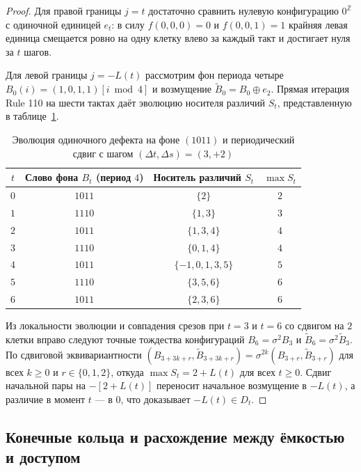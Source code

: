 \begin{proof}
Для правой границы $j = t$ достаточно сравнить нулевую конфигурацию $0^{\mathbb{Z}}$ с одиночной единицей $e_t$: в силу $f(0, 0, 0) = 0$ и $f(0, 0, 1) = 1$ крайняя левая единица смещается ровно на одну клетку влево за каждый такт и достигает нуля за $t$ шагов.

Для левой границы $j = -L(t)$ рассмотрим фон периода четыре $B_0(i) = (1, 0, 1, 1)[i \bmod 4]$ и возмущение $\widetilde B_0 = B_0 \oplus e_2$. Прямая итерация Rule 110 на шести тактах даёт эволюцию носителя различий $S_t$, представленную в таблице~\ref{tab:period4_defect}.

\begin{table}[h]
\centering
\caption{Эволюция одиночного дефекта на фоне $(1011)$ и периодический сдвиг с шагом $(\Delta t, \Delta s) = (3, +2)$}
\label{tab:period4_defect}
\begin{tabular}{cccc}
\toprule
$t$ & Слово фона $B_t$ (период $4$) & Носитель различий $S_t$ & $\max S_t$ \\
\midrule
$0$ & $1011$ & $\{2\}$ & $2$ \\
$1$ & $1110$ & $\{1, 3\}$ & $3$ \\
$2$ & $1011$ & $\{1, 3, 4\}$ & $4$ \\
$3$ & $1110$ & $\{0, 1, 4\}$ & $4$ \\
$4$ & $1011$ & $\{-1, 0, 1, 3, 5\}$ & $5$ \\
$5$ & $1110$ & $\{3, 5, 6\}$ & $6$ \\
$6$ & $1011$ & $\{2, 3, 6\}$ & $6$ \\
\bottomrule
\end{tabular}
\end{table}

Из локальности эволюции и совпадения срезов при $t=3$ и $t=6$ со сдвигом на $2$ клетки вправо следуют точные тождества конфигураций $B_6 = \sigma^2 B_3$ и $\widetilde B_6 = \sigma^2 \widetilde B_3$. По сдвиговой эквивариантности $(B_{3+3k+r}, \widetilde B_{3+3k+r}) = \sigma^{2k}(B_{3+r}, \widetilde B_{3+r})$ для всех $k \ge 0$ и $r \in \{0, 1, 2\}$, откуда $\max S_t = 2 + L(t)$ для всех $t \ge 0$. Сдвиг начальной пары на $-[2 + L(t)]$ переносит начальное возмущение в $-L(t)$, а различие в момент $t$ — в $0$, что доказывает $-L(t) \in D_t$.
\end{proof}

\subsection{Конечные кольца и расхождение между ёмкостью и доступом}

